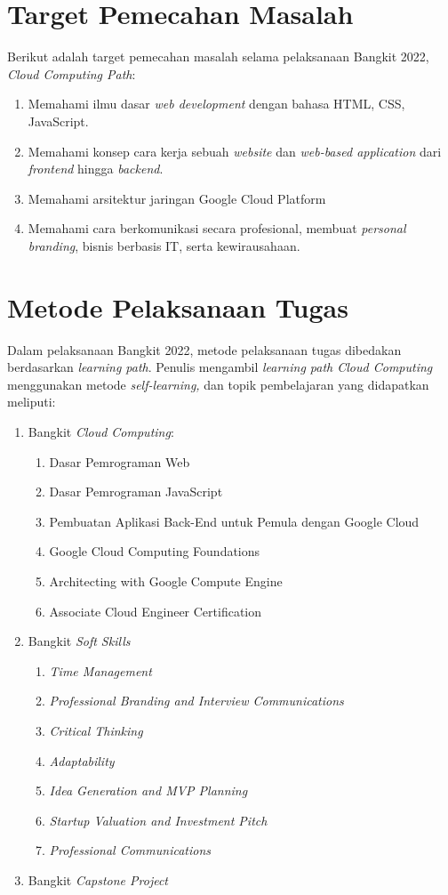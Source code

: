 \section{Target Pemecahan Masalah}
Berikut adalah target pemecahan masalah selama pelaksanaan Bangkit 2022, \textit{Cloud Computing Path}:
\begin{enumerate}
	\item Memahami ilmu dasar \textit{web development} dengan bahasa HTML, CSS, JavaScript.
	\item Memahami konsep cara kerja sebuah \textit{website} dan \textit{web-based application} dari \textit{frontend} hingga \textit{backend}.
	\item Memahami arsitektur jaringan Google Cloud Platform
	\item Memahami cara berkomunikasi secara profesional, membuat \textit{personal branding}, bisnis berbasis IT, serta kewirausahaan.
\end{enumerate}

\section{Metode Pelaksanaan Tugas}
Dalam pelaksanaan Bangkit 2022, metode pelaksanaan tugas dibedakan berdasarkan \textit{learning path}. Penulis mengambil \textit{learning path Cloud Computing} menggunakan metode \textit{self-learning,} dan topik pembelajaran yang didapatkan meliputi:
\begin{enumerate}
	\item Bangkit \textit{Cloud Computing}:
	\begin{enumerate}
		\item Dasar Pemrograman Web
		\item Dasar Pemrograman JavaScript
		\item Pembuatan Aplikasi Back-End untuk Pemula dengan Google Cloud
		\item Google Cloud Computing Foundations
		\item Architecting with Google Compute Engine
		\item Associate Cloud Engineer Certification
	\end{enumerate}
	\item Bangkit \textit{Soft Skills}
	\begin{enumerate}
		\item \textit{Time Management}
		\item \textit{Professional Branding and Interview Communications}
		\item \textit{Critical Thinking}
		\item \textit{Adaptability}
		\item \textit{Idea Generation and MVP Planning}
		\item \textit{Startup Valuation and Investment Pitch}
		\item \textit{Professional Communications}
	\end{enumerate}
	\item Bangkit \textit{Capstone Project}
\end{enumerate} 

